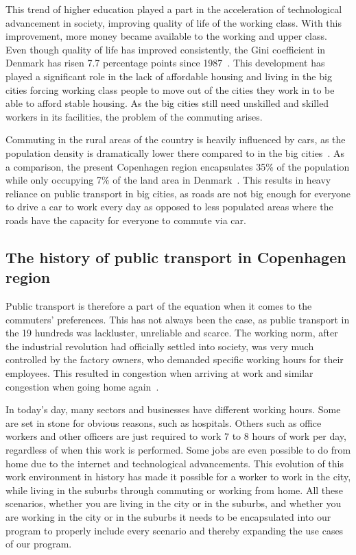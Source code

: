 This trend of higher education played a part in the acceleration of technological advancement in society, improving
quality of life of the working class.
With this improvement, more money became available to the working and upper class.
Even though quality of life has improved consistently, the Gini coefficient in Denmark has risen 7.7 percentage points
since 1987~\cite{cepos2023}.
This development has played a significant role in the lack of affordable housing and living in the big cities forcing
working class people to move out of the cities they work in to be able to afford stable housing.
As the big cities still need unskilled and skilled workers in its facilities, the problem of the commuting arises.

Commuting in the rural areas of the country is heavily influenced by cars, as the population density is dramatically
lower there compared to in the big cities~\cite{mulacic2020}.
As a comparison, the present Copenhagen region encapsulates 35\% of the
population while only occupying 7\% of the land area in Denmark~\cite{nielsen&lemberg2017}.
This results in heavy reliance on public transport in big cities, as roads are not big enough for everyone to drive a
car to work every day as opposed to less populated areas where the roads have the capacity for everyone to commute via
car.

\subsection{The history of public transport in Copenhagen region}
\label{subsec:the-history-of-public-transport-in-copenhagen-region}

Public transport is therefore a part of the equation when it comes to the commuters' preferences.
This has not always been the case, as public transport in the 19 hundreds was lackluster, unreliable and scarce.
The working norm, after the industrial revolution had officially settled into society, was very much controlled by the
factory owners, who demanded specific working hours for their employees.
This resulted in congestion when arriving at work and similar congestion when going home again~\cite{bek2022}.

In today's day, many sectors and businesses have different working hours.
Some are set in stone for obvious reasons, such as hospitals.
Others such as office workers and other officers are just required to work 7 to 8 hours of work per day, regardless of
when this work is performed.
Some jobs are even possible to do from home due to the internet and technological advancements.
This evolution of this work environment in history has made it possible for a worker to work in the city, while living
in the suburbs through commuting or working from home.
All these scenarios, whether you are living in the city or in the suburbs, and whether you are working in the city or
in the suburbs it needs to be encapsulated into our program to properly include every scenario and thereby expanding the
use cases of our program.
